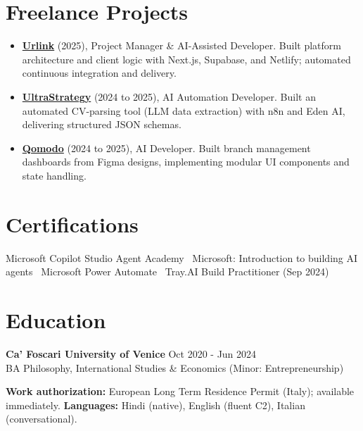 \documentclass[a4paper,10pt]{article}
\begin{document}
\section{Freelance Projects}
\begin{itemize}
 \item \textbf{\href{https://smarturlink.com/}{Urlink}} (2025), Project Manager \& AI-Assisted Developer. Built platform architecture and client logic with Next.js, Supabase, and Netlify; automated continuous integration and delivery.
 \item \textbf{\href{https://ultrastrategy.com}{UltraStrategy}} (2024 to 2025), AI Automation Developer. Built an automated CV-parsing tool (LLM data extraction) with n8n and Eden AI, delivering structured JSON schemas.
 \item \textbf{\href{https://www.qomodo.me/}{Qomodo}} (2024 to 2025), AI Developer. Built branch management dashboards from Figma designs, implementing modular UI components and state handling.
\end{itemize}

\section{Certifications}
Microsoft Copilot Studio Agent Academy \textbullet\ Microsoft: Introduction to building AI agents \textbullet\ Microsoft Power Automate \textbullet\ Tray.AI Build Practitioner (Sep 2024)

\section{Education}
\textbf{Ca' Foscari University of Venice} \hfill Oct 2020 - Jun 2024\\
BA Philosophy, International Studies \& Economics (Minor: Entrepreneurship)

\vspace{2pt}
{\small \textbf{Work authorization:} European Long Term Residence Permit (Italy); available immediately. \quad \textbf{Languages:} Hindi (native), English (fluent C2), Italian (conversational).}
\end{document}
